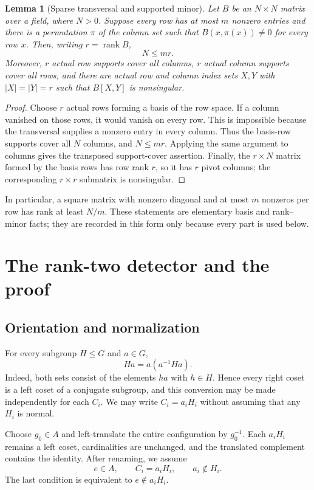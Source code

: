 \documentclass[11pt,a4paper]{amsart}
\newtheorem{lemma}[theorem]{Lemma}
\theoremstyle{definition}
\theoremstyle{remark}
\newcommand{\rank}{\operatorname{rank}}
\begin{document}
\begin{lemma}[Sparse transversal and supported minor]\label{lem:sparse}
Let $B$ be an $N\times N$ matrix over a field, where $N>0$.  Suppose every row
has at most $m$ nonzero entries and there is a permutation $\pi$ of the column
set such that $B(x,\pi(x))\ne0$ for every row $x$.  Then, writing
$r=\rank B$,
\[
  N\le mr.
\]
Moreover, $r$ actual row supports cover all columns, $r$ actual column supports
cover all rows, and there are actual row and column index sets $X,Y$ with
$|X|=|Y|=r$ such that $B[X,Y]$ is nonsingular.
\end{lemma}

\begin{proof}
Choose $r$ actual rows forming a basis of the row space.  If a column vanished
on those rows, it would vanish on every row.  This is impossible because the
transversal supplies a nonzero entry in every column.  Thus the basis-row
supports cover all $N$ columns, and $N\le mr$.  Applying the same argument to
columns gives the transposed support-cover assertion.  Finally, the $r\times N$
matrix formed by the basis rows has row rank $r$, so it has $r$ pivot columns;
the corresponding $r\times r$ submatrix is nonsingular.
\end{proof}

In particular, a square matrix with nonzero diagonal and at most $m$ nonzeros
per row has rank at least $N/m$.  These statements are elementary basis and
rank--minor facts; they are recorded in this form only because every part is
used below.

\section{The rank-two detector and the proof}

\subsection{Orientation and normalization}
For every subgroup $H\le G$ and $a\in G$,
\[
  Ha=a(a^{-1}Ha).
\]
Indeed, both sets consist of the elements $ha$ with $h\in H$.  Hence every
right coset is a left coset of a conjugate subgroup, and this conversion may be
made independently for each $C_i$.  We may write
$C_i=a_iH_i$ without assuming that any $H_i$ is normal.

Choose $g_0\in A$ and left-translate the entire configuration by $g_0^{-1}$.
Each $a_iH_i$ remains a left coset, cardinalities are unchanged, and the
translated complement contains the identity.  After renaming, we assume
\[
  e\in A,\qquad C_i=a_iH_i,\qquad a_i\notin H_i.
\]
The last condition is equivalent to $e\notin a_iH_i$.
\end{document}
